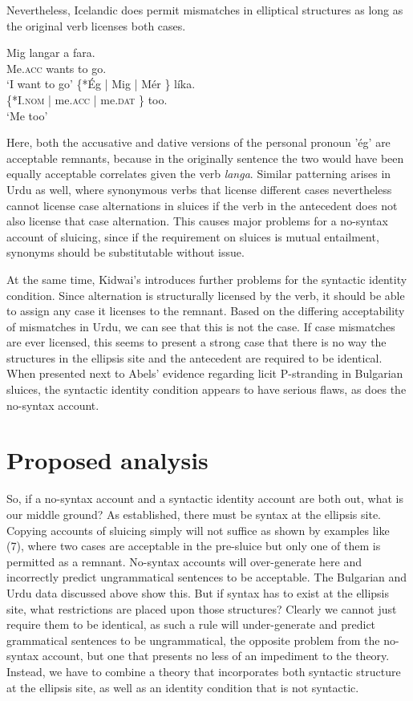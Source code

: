 \documentclass{turabian-researchpaper}
\begin{document}
Nevertheless, Icelandic does permit mismatches in elliptical structures as long as the original verb licenses both cases.

\begin{exe}
\ex\label{mariadrove}
\gll {} Mig langar {a\dh} fara. \\
{} Me.\textsc{acc} wants to go. \\
\trans `I want to go' 
\gll {} \{*\'Eg | Mig | M\'er \} l\'ika. \\ 
{} \{*I.\textsc{nom} | me.\textsc{acc} | me.\textsc{dat} \} too. \\
\trans `Me too' 
\end{exe}

Here, both the accusative and dative versions of the personal pronoun '\'eg' are acceptable remnants, because in the originally sentence the two would have been equally acceptable correlates given the verb \textit{langa}.  Similar patterning arises in Urdu as well, where synonymous verbs that license different cases nevertheless cannot license case alternations in sluices if the verb in the antecedent does not also license that case alternation. This causes major problems for a no-syntax account of sluicing, since if the requirement on sluices is mutual entailment, synonyms should be substitutable without issue. 

At the same time, Kidwai's introduces further problems for the syntactic identity condition. Since alternation is structurally licensed by the verb, it should be able to assign any case it licenses to the remnant. Based on the differing acceptability of mismatches in Urdu, we can see that this is not the case. If case mismatches are ever licensed, this seems to present a strong case that there is no way the structures in the ellipsis site and the antecedent are required to be identical. When presented next to Abels' evidence regarding licit P-stranding in Bulgarian sluices, the syntactic identity condition appears to have serious flaws, as does the no-syntax account. 

\section{Proposed analysis} 
So, if a no-syntax account and a syntactic identity account are both out, what is our middle ground? As established, there must be syntax at the ellipsis site. Copying accounts of sluicing simply will not suffice as shown by examples like (7), where two cases are acceptable in the pre-sluice but only one of them is permitted as a remnant. No-syntax accounts will over-generate here and incorrectly predict ungrammatical sentences to be acceptable. The Bulgarian and Urdu data discussed above show this. But if syntax has to exist at the ellipsis site, what restrictions are placed upon those structures? Clearly we cannot just require them to be identical, as such a rule will under-generate and predict grammatical sentences to be ungrammatical, the opposite problem from the no-syntax account, but one that presents no less of an impediment to the theory. Instead, we have to combine a theory that incorporates both syntactic structure at the ellipsis site, as well as an identity condition that is not syntactic. 
\end{document}
